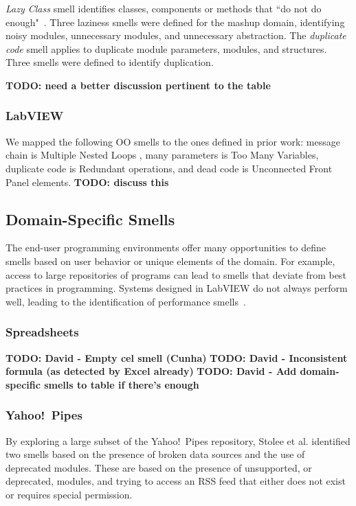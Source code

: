 \documentclass[10pt,conference,compsocconf]{IEEEtran}
\newcommand{\todo}[1]{\textbf{TODO: #1}}
\begin{document}

\emph{Lazy Class} smell identifies classes, components or methods that ``do not do enough"~\cite{Fowl1999}. Three laziness smells were defined for the mashup domain, identifying noisy modules, unnecessary modules, and unnecessary abstraction. The \emph{duplicate code} smell applies to duplicate module parameters, modules, and structures. Three smells were defined to identify duplication. 

\todo{need a better discussion pertinent to the table}

\subsubsection{LabVIEW}

We mapped the following OO smells to the ones defined in prior work\cite{chambers2013smell}: message chain is Multiple Nested Loops , many parameters is Too Many Variables, duplicate code is Redundant operations, and dead code is Unconnected Front Panel
elements. 
\todo{discuss this}

\subsection{Domain-Specific Smells}
The end-user programming environments offer many opportunities to define smells based on user behavior or unique elements of the domain. For example, access to large repositories of programs can lead to smells that deviate from best practices in programming. Systems designed in LabVIEW do not always perform well, leading to the identification of performance smells~\cite{chambers2013smell}. 

\subsubsection{Spreadsheets}

\todo{David - Empty cel smell (Cunha)}
\todo{David - Inconsistent formula (as detected by Excel already)}
\todo{David - Add domain-specific smells to table if there's enough}

\subsubsection{Yahoo!\ Pipes}
By exploring a large subset of the Yahoo!\ Pipes repository, Stolee et al. identified two smells based on the presence of broken data sources and the use of deprecated modules. These are based on the presence of unsupported, or deprecated, modules, and trying to access an RSS feed that either does not exist or requires special permission. 
\end{document}
